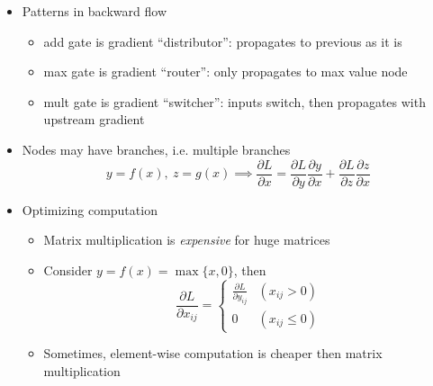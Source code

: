 \begin{itemize}
\begin{itemize}
    \end{itemize}
    \item Patterns in backward flow
    \begin{itemize}
        \item add gate is gradient ``distributor'': propagates to previous as it is
        \item max gate is gradient ``router'': only propagates to max value node
        \item mult gate is gradient ``switcher'': inputs switch, then propagates with upstream gradient
    \end{itemize}
    \item Nodes may have branches, i.e. multiple branches
    \begin{equation}
        y=f(x),~z=g(x)\implies\frac{\partial L}{\partial x}=\frac{\partial L}{\partial y}\frac{\partial y}{\partial x}+\frac{\partial L}{\partial z}\frac{\partial z}{\partial x}
    \end{equation}
    \item Optimizing computation
    \begin{itemize}
        \item Matrix multiplication is \textit{expensive} for huge matrices
        \item Consider $y=f(x)=\max\{x,0\}$, then
        \begin{equation}
            \frac{\partial L}{\partial x_{ij}}=\begin{cases}
                \frac{\partial L}{\partial y_{ij}} & (x_{ij}>0) \\
                0 & (x_{ij}\leq 0)
            \end{cases}
        \end{equation}
        \item Sometimes, element-wise computation is cheaper then matrix multiplication
    \end{itemize}
\end{itemize}
